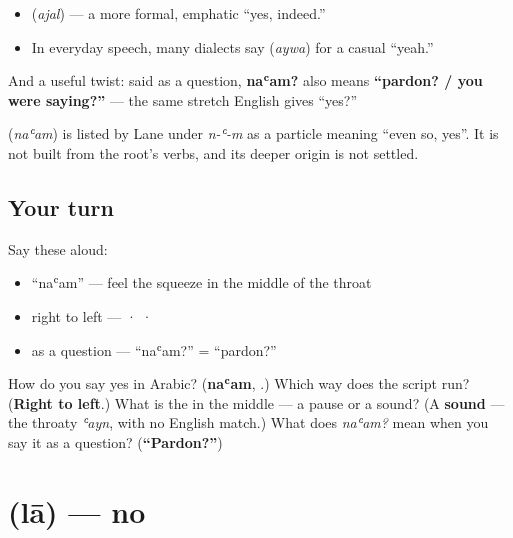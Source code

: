 \begin{itemize}
\raggedright
  \item \textbf{} (\emph{ajal}) — a more formal, emphatic \textquotedblleft{}yes, indeed.\textquotedblright{}
  \item In everyday speech, many dialects say \textbf{} (\emph{aywa}) for a casual \textquotedblleft{}yeah.\textquotedblright{}
\end{itemize}

And a useful twist: said as a question, \textbf{naʿam?} also means \textbf{\textquotedblleft{}pardon? / you were saying?\textquotedblright{}} — the same stretch English gives \textquotedblleft{}yes?\textquotedblright{}

\begin{cousinweb}
\textbf{} (\emph{naʿam}) is listed by Lane under \emph{n-ʿ-m} as a particle meaning \textquotedblleft{}even so, yes\textquotedblright{}. It is not built from the root's verbs, and its deeper origin is not settled.
\end{cousinweb}

\subsection*{Your turn}
Say these aloud:

\begin{itemize}
\raggedright
  \item \textquotedblleft{}naʿam\textquotedblright{} — feel the  squeeze in the middle of the throat
  \item right to left —  ·  · 
  \item as a question — \textquotedblleft{}naʿam?\textquotedblright{} = \textquotedblleft{}pardon?\textquotedblright{}
\end{itemize}

\begin{tcolorbox}[breakable,colback=teal!4,colframe=teal!35!black,title={Before you move on}]
How do you say yes in Arabic? (\textbf{naʿam}, .) Which way does the script run? (\textbf{Right to left}.) What is the \textbf{} in the middle — a pause or a sound? (A \textbf{sound} — the throaty \emph{ʿayn}, with no English match.) What does \emph{naʿam?} mean when you say it as a question? (\textbf{\textquotedblleft{}Pardon?\textquotedblright{}})
\end{tcolorbox}
\section[\texorpdfstring{\ar{لا} (lā)}{لا (lā)}]{ (lā) — no}

